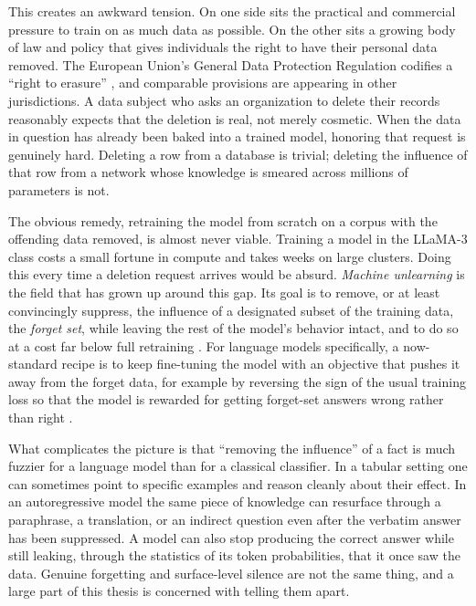 \documentclass[a4paper,12pt]{report}
\begin{document}
This creates an awkward tension. On one side sits the practical and commercial pressure to train on as much data as possible. On the other sits a growing body of law and policy that gives individuals the right to have their personal data removed. The European Union's General Data Protection Regulation codifies a ``right to erasure'' \parencite{gdpr2016}, and comparable provisions are appearing in other jurisdictions. A data subject who asks an organization to delete their records reasonably expects that the deletion is real, not merely cosmetic. When the data in question has already been baked into a trained model, honoring that request is genuinely hard. Deleting a row from a database is trivial; deleting the influence of that row from a network whose knowledge is smeared across millions of parameters is not.

The obvious remedy, retraining the model from scratch on a corpus with the offending data removed, is almost never viable. Training a model in the LLaMA-3 class costs a small fortune in compute and takes weeks on large clusters. Doing this every time a deletion request arrives would be absurd. \emph{Machine unlearning} is the field that has grown up around this gap. Its goal is to remove, or at least convincingly suppress, the influence of a designated subset of the training data, the \emph{forget set}, while leaving the rest of the model's behavior intact, and to do so at a cost far below full retraining \parencite{cao2015unlearning, bourtoule2021machine}. For language models specifically, a now-standard recipe is to keep fine-tuning the model with an objective that pushes it away from the forget data, for example by reversing the sign of the usual training loss so that the model is rewarded for getting forget-set answers wrong rather than right \parencite{yao2023unlearning}.

What complicates the picture is that ``removing the influence'' of a fact is much fuzzier for a language model than for a classical classifier. In a tabular setting one can sometimes point to specific examples and reason cleanly about their effect. In an autoregressive model the same piece of knowledge can resurface through a paraphrase, a translation, or an indirect question even after the verbatim answer has been suppressed. A model can also stop producing the correct answer while still leaking, through the statistics of its token probabilities, that it once saw the data. Genuine forgetting and surface-level silence are not the same thing, and a large part of this thesis is concerned with telling them apart.
\end{document}
